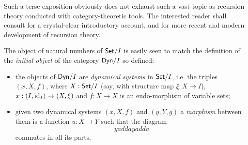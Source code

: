 Such a terse exposition obviously does not exhaust such a vast topic as recursion theory conducted with category-theoretic tools. The interested reader shall consult \cite{jacobs1997tutorial} for a crystal-clear introductory account, and \cite{cockett2008introduction,cockett2014total} for more recent and modern development of recursion theory.

The object of natural numbers of $\mathsf{Set}/I$ is easily seen to match the definition of the \emph{initial object} \cite[]{Bor1} of the category $\mathsf{Dyn}/I$ so defined:
\begin{itemize}
	\item the objects of $\mathsf{Dyn}/I$ are \emph{dynamical systems} in $\mathsf{Set}/I$, i.e. the triples $(x,X,f)$, where $X : \mathsf{Set}/I$ (say, with structure map $\xi : X \to I$), $x : (I,\text{id}_I) \to (X,\xi)$ and $f : X \to X$ is an endo-morphism of variable sets;
	\item given two dynamical systems $(x,X,f)$ and $(y,Y,g)$ a \emph{morphism} between them is a function $u  :X \to Y$ such that the diagram
	\[yadda yadda\]
	commutes in all its parts.
\end{itemize}